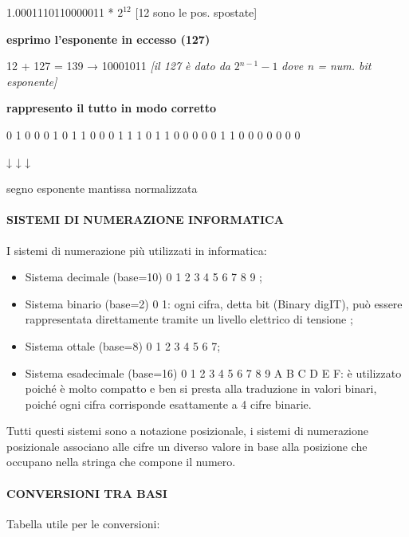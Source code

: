 1.0001110110000011 * \(2^{12}\) {[}12 sono le pos. spostate{]}

\textbf{esprimo l'esponente in eccesso (127)}

12 + 127 = 139 → 10001011 \emph{{[}il 127 è dato da} \(2{}^{n - 1} - 1\)
\emph{dove n = num. bit esponente{]}}

\textbf{rappresento il tutto in modo corretto}

0 1 0 0 0 1 0 1 1 0 0 0 1 1 1 0 1 1 0 0 0 0 0 1 1 0 0 0 0 0 0 0

↓ ↓ ↓

segno esponente mantissa normalizzata

\paragraph{SISTEMI DI NUMERAZIONE
INFORMATICA}\label{sistemi-di-numerazione-informatica}

I sistemi di numerazione più utilizzati in informatica:

\begin{itemize}
\item
  Sistema decimale (base=10) 0 1 2 3 4 5 6 7 8 9 ;
\item
  Sistema binario (base=2) 0 1: ogni cifra, detta bit (Binary digIT),
  può essere rappresentata direttamente tramite un livello elettrico di
  tensione ;
\item
  Sistema ottale (base=8) 0 1 2 3 4 5 6 7;
\item
  Sistema esadecimale (base=16) 0 1 2 3 4 5 6 7 8 9 A B C D E F: è
  utilizzato poiché è molto compatto e ben si presta alla traduzione in
  valori binari, poiché ogni cifra corrisponde esattamente a 4 cifre
  binarie.
\end{itemize}

Tutti questi sistemi sono a notazione posizionale, i sistemi di
numerazione posizionale associano alle cifre un diverso valore in base
alla posizione che occupano nella stringa che compone il numero.

\paragraph{CONVERSIONI TRA BASI}\label{conversioni-tra-basi}

Tabella utile per le conversioni:

